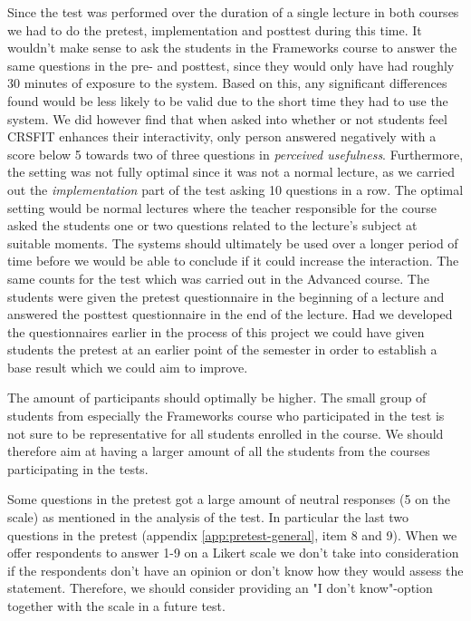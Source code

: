 Since the test was performed over the duration of a single lecture in both courses we had to do the pretest, implementation and posttest during this time. It wouldn't make sense to ask the students in the Frameworks course to answer the same questions in the pre- and posttest, since they would only have had roughly 30 minutes of exposure to the system. Based on this, any significant differences found would be less likely to be valid due to the short time they had to use the system. We did however find that when asked into whether or not students feel CRSFIT enhances their interactivity, only person answered negatively with a score below 5 towards two of three questions in \emph{perceived usefulness}. Furthermore, the setting was not fully optimal since it was not a normal lecture, as we carried out the \emph{implementation} part of the test asking 10 questions in a row. The optimal setting would be normal lectures where the teacher responsible for the course asked the students one or two questions related to the lecture's subject at suitable moments. The systems should ultimately be used over a longer period of time before we would be able to conclude if it could increase the interaction. The same counts for the test which was carried out in the Advanced course. The students were given the pretest questionnaire in the beginning of a lecture and answered the posttest questionnaire in the end of the lecture. Had we developed the questionnaires earlier in the process of this project we could have given students the pretest at an earlier point of the semester in order to establish a base result which we could aim to improve.

The amount of participants should optimally be higher. The small group of students from especially the Frameworks course who participated in the test is not sure to be representative for all students enrolled in the course. We should therefore aim at having a larger amount of all the students from the courses participating in the tests.



Some questions in the pretest got a large amount of neutral responses (5 on the scale) as mentioned in the analysis of the test. In particular the last two questions in the pretest (appendix \ref{app:pretest-general}, item 8 and 9). When we offer respondents to answer 1-9 on a Likert scale we don't take into consideration if the respondents don't have an opinion or don't know how they would assess the statement. Therefore, we should consider providing an "I don't know"-option together with the scale in a future test. 


